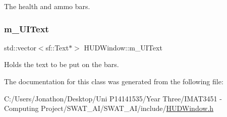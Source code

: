 The health and ammo bars. 

\mbox{\label{class_h_u_d_window_a5343d0d3d11dfb0422e22f43a3b24e73}} 
\subsubsection{\texorpdfstring{m\+\_\+\+U\+I\+Text}{m\_UIText}}
{\footnotesize\ttfamily std\+::vector$<$sf\+::\+Text$\ast$$>$ H\+U\+D\+Window\+::m\+\_\+\+U\+I\+Text\hspace{0.3cm}{\ttfamily [private]}}



Holds the text to be put on the bars. 



The documentation for this class was generated from the following file\+:\begin{DoxyCompactItemize}
\item 
C\+:/\+Users/\+Jonathon/\+Desktop/\+Uni P14141535/\+Year Three/\+I\+M\+A\+T3451 -\/ Computing Project/\+S\+W\+A\+T\+\_\+\+A\+I/\+S\+W\+A\+T\+\_\+\+A\+I/include/\hyperlink{_h_u_d_window_8h}{H\+U\+D\+Window.\+h}\end{DoxyCompactItemize}
